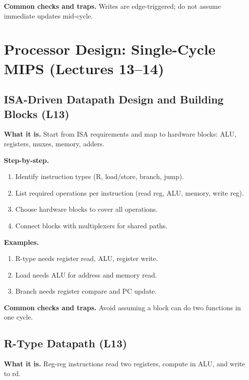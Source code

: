 \documentclass[11pt]{article}
\begin{document}
\textbf{Common checks and traps.} Writes are edge-triggered; do not assume immediate updates mid-cycle.

\section{Processor Design: Single-Cycle MIPS (Lectures 13--14)}

\subsection{ISA-Driven Datapath Design and Building Blocks (L13)}
\textbf{What it is.} Start from ISA requirements and map to hardware blocks: ALU, registers, muxes, memory, adders.

\textbf{Step-by-step.}
\begin{enumerate}[leftmargin=*]
  \item Identify instruction types (R, load/store, branch, jump).
  \item List required operations per instruction (read reg, ALU, memory, write reg).
  \item Choose hardware blocks to cover all operations.
  \item Connect blocks with multiplexers for shared paths.
\end{enumerate}

\textbf{Examples.}
\begin{enumerate}[leftmargin=*]
  \item R-type needs register read, ALU, register write.
  \item Load needs ALU for address and memory read.
  \item Branch needs register compare and PC update.
\end{enumerate}

\textbf{Common checks and traps.} Avoid assuming a block can do two functions in one cycle.

\begin{figure}[h]
\centering
{}
\end{figure}

\subsection{R-Type Datapath (L13)}
\textbf{What it is.} Reg-reg instructions read two registers, compute in ALU, and write to rd.
\end{document}
